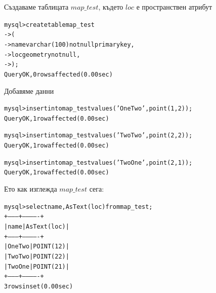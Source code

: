 \documentclass{beamer}
\begin{document}



\begin{frame}[fragile]
\begin{beamerboxesrounded}{Създаваме таблицата $map\_test$, където $loc$ е пространствен атрибут}
\begin{alltt}
mysql> create table map_test
    -> (
    ->   name varchar(100) not null primary key,
    ->   \alert{loc  geometry not null},
    -> );
Query OK, 0 rows affected (0.00 sec)
\end{alltt}
\end{beamerboxesrounded}

\begin{beamerboxesrounded}{Добавяме данни}
\begin{alltt}
mysql> insert into map_test values ('One Two', point(1,2));
Query OK, 1 row affected (0.00 sec)

mysql> insert into map_test values ('Two Two', point(2,2));
Query OK, 1 row affected (0.00 sec)

mysql> insert into map_test values ('Two One', point(2,1));
Query OK, 1 row affected (0.00 sec)
\end{alltt}
\end{beamerboxesrounded}
\end{frame}


\begin{frame}[fragile]
\begin{beamerboxesrounded}{Ето как изглежда $map\_test$ сега:}
\begin{alltt}
mysql> select name, AsText(loc) from map_test;
+---------+-------------+
| name    | AsText(loc) |
+---------+-------------+
| One Two | POINT(1 2)  |
| Two Two | POINT(2 2)  |
| Two One | POINT(2 1)  |
+---------+-------------+
3 rows in set (0.00 sec)
\end{alltt}
\end{beamerboxesrounded}
\end{frame}
\end{document}

